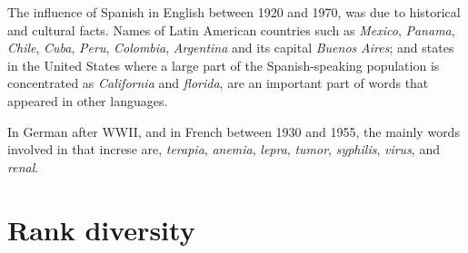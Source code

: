 \documentclass[10pt,letterpaper]{article} %
\begin{document}
The influence of Spanish in English between 1920 and 1970, was due to
historical and cultural facts. Names of Latin American  countries such as
\textit{Mexico}, \textit{Panama}, \textit{Chile}, \textit{Cuba}, \textit{Peru},
\textit{Colombia}, \textit{Argentina} and its capital \textit{Buenos}
\textit{Aires};  and states in the United States  where a large part of the
Spanish-speaking population is concentrated as \textit{California} and
\textit{florida}, are an important part of words that appeared in 
other languages. 

In German after WWII, and in French between 1930 and 1955, the mainly words
involved in that increse are, \textit{terapia}, \textit{anemia},
\textit{lepra}, \textit{tumor}, \textit{syphilis}, \textit{virus}, and
\textit{renal}. 



\section*{Rank diversity} %
\end{document}
